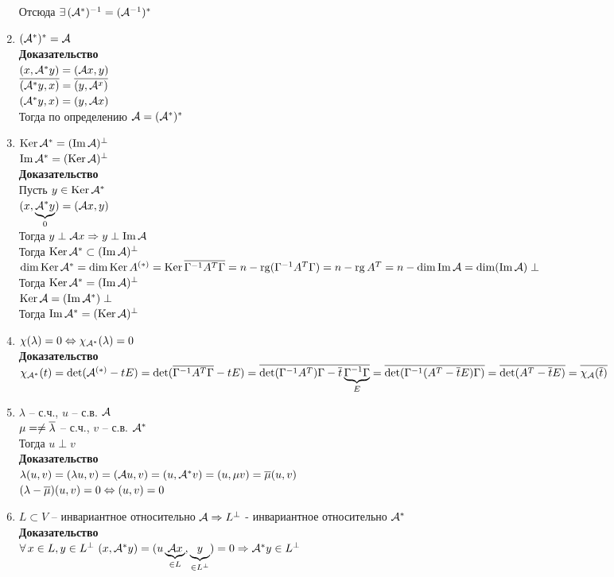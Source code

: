 \documentclass[12pt]{article}
\begin{document}
\begin{enumerate}
        Отсюда $\ex (\mcA^*)^{-1} = (\mcA^{-1})^* $
    \item $(\mcA^*)^* = \mcA $\\
        \textbf{Доказательство}\\
        $(x, \mcA^* y) = (\mcA x, y) $\\
        $\ol{(\mcA^* y, x)} = \ol{(y, \mcA^x)} $\\
        $(\mcA^* y, x) = (y, \mcA x)$\\
        Тогда по определению $\mcA = (\mcA^*)^* $
    \item $\ker \mcA^* = (\im \mcA)^\perp $\\
        $\im \mcA^* = (\ker \mcA)^\perp $\\
        \textbf{Доказательство}\\
        Пусть $y \in \ker \mcA^*$\\
        $(x, \ub{0}{\mcA^* y}) = (\mcA x, y)$\\
        Тогда $y \perp \mcA x \Rto y \perp \im \mcA $\\
        Тогда $\ker \mcA^* \subset (\im \mcA)^\perp $\\
        $\dim \ker \mcA^* = \dim \ker A^{(*)} = \ker \ol{ \Gamma^{-1} A^T \Gamma} = n - \rg( \Gamma^{-1}A^T \Gamma) = n - \rg A^T = n - \dim \im \mcA = \dim (\im \mcA)\perp$\\
        Тогда $\ker \mcA^* = (\im \mcA)^\perp $\\
        $\ker \mcA = (\im \mcA^*)\perp$\\
        Тогда $\im \mcA^* = (\ker \mcA)^\perp$\\
    \item $\chi( \lambda) = 0 \LRto \chi_{\mcA^*} ( \lambda) = 0$\\
        \textbf{Доказательство}\\
        $\chi_{\mcA^*}(t) = \det (\mcA^{(*)} - tE) = \det(\ol{ \Gamma^{-1}A^T \Gamma} - tE) = \ol{\det( \Gamma^{-1}A^T) \Gamma  - \ol t \ub{E}{\Gamma^{-1} \Gamma}} = \ol{\det( \Gamma^{-1}(A^T - \ol tE) \Gamma)} = \ol{\det (A^T - \ol t E)}  = \ol {\chi_\mcA(\ol t)} $
    \item $ \lambda$ -- с.ч., $u$ -- с.в. $\mcA$\\
        $\mu = \neq \ol \lambda$ -- с.ч., $v$ -- с.в. $\mcA^*$\\
        Тогда $u \perp v$\\
        \textbf{Доказательство}\\
        $ \lambda(u, v) = ( \lambda u, v) = (\mcA u, v) = (u, \mcA^* v) = (u, \mu v) = \ol \mu (u, v)$\\
        $( \lambda - \ol \mu)(u, v) = 0 \LRto (u, v) = 0$
    \item $L \subset V$ -- инвариантное относительно $\mcA \Rto L^\perp$ - инвариантное относительно $\mcA^*$\\
        \textbf{Доказательство}\\
        $\fall x \in L, y \in L^\perp\ (x, \mcA^* y) = (u\ub{\in L}{\mcA x}, \ub{\in L^\perp}y) = 0 \Rto \mcA^* y \in L^\perp$
\end{enumerate}
\end{document}

